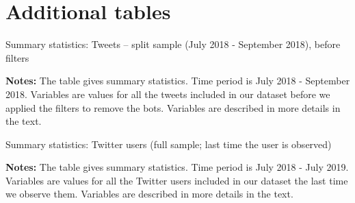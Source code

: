 


\clearpage 
\pagebreak
\section{Additional tables \label{Sec:AdTables}}

\begin{table}
\caption{Summary statistics: Tweets -- split sample (July 2018 - September 2018), before filters}
\begin{center}
	
\end{center}
\begin{spacing}{0.5}
	{\fns \textbf{Notes:} The table gives summary statistics. Time period is July 2018 - September 2018. Variables are values for all the tweets included in our dataset before we applied the filters to remove the bots. Variables are described in more details in the text.} 
\end{spacing}
\label{Tab:sum_stat_tweets_split_sample_bflitre}
\end{table} 


\begin{table}
\caption{Summary statistics: Twitter users (full sample; last time the user is observed)}
\begin{center}
	
\end{center}
\begin{spacing}{0.5}
	{\fns \textbf{Notes:} The table gives summary statistics. Time period is July 2018 - July 2019. Variables are values for all the Twitter users included in our dataset the last time we observe them. Variables are described in more details in the text.} 
\end{spacing}
\label{Tab:table_summary_users_all_last}
\end{table} 


